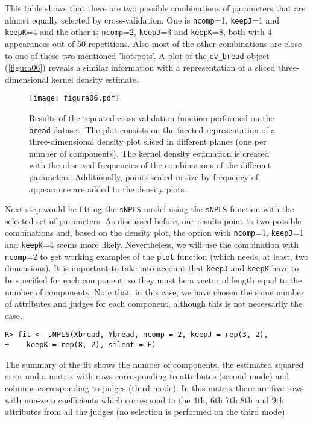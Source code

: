 This table shows that there are two possible combinations of parameters that are almost equally selected by cross-validation. One is \texttt{ncomp}=1, \texttt{keepJ}=1 and \texttt{keepK}=4 and the other is \texttt{ncomp}=2, \texttt{keepJ}=3 and \texttt{keepK}=8, both with 4 appearances out of 50 repetitions. Also most of the other combinations are close to one of these two mentioned 'hotspots'. A plot of the \texttt{cv\_bread} object (\autoref{figura06}) reveals a similar information with a representation of a sliced three-dimensional kernel density estimate.


\begin{figure}[!ht]
	\centering
\texttt{[image: figura06.pdf]}
\caption{Results of the repeated cross-validation function performed on the \texttt{bread} dataset. The plot consists on the faceted representation of a three-dimensional density plot sliced in different planes (one per number of components). The kernel density estimation is created with the observed frequencies of the combinations of the different parameters. Additionally, points scaled in size by frequency of appearance are added to the density plots.}
\label{figura06}
\end{figure}

Next step would be fitting the \texttt{sNPLS} model using the \texttt{sNPLS} function with the selected set of parameters. As discussed before, our results point to two possible combinations and, based on the density plot, the option with \texttt{ncomp}=1, \texttt{keepJ}=1 and \texttt{keepK}=4 seems more likely. Nevertheless, we will use the combination with \texttt{ncomp}=2 to get working examples of the \texttt{plot} function (which needs, at least, two dimensions). It is important to take into account that \texttt{keepJ} and \texttt{keepK} have to be specified for each component, so they must be a vector of length equal to the number of components. Note that, in this case, we have chosen the same number of attributes and judges for each component, although this is not necessarily the case.

\begin{verbatim}
R> fit <- sNPLS(Xbread, Ybread, ncomp = 2, keepJ = rep(3, 2), 
+    keepK = rep(8, 2), silent = F)
\end{verbatim}

The summary of the fit shows the number of components, the estimated squared error and a matrix with rows corresponding to attributes (second mode) and columns corresponding to judges (third mode). In this matrix there are five rows with non-zero coefficients which correspond to the 4th, 6th 7th 8th and 9th attributes from all the judges (no selection is performed on the third mode).

